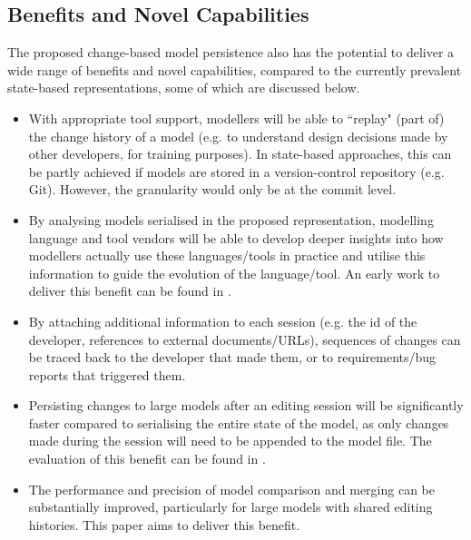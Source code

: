 \subsection{Benefits and Novel Capabilities}
\label{sec:benefits_and_novel_capabilities}
The proposed change-based model persistence also has the potential to deliver a wide range of benefits and novel capabilities, compared to the currently prevalent state-based representations, some of which are discussed below.

\begin{itemize}
  \item With appropriate tool support, modellers will be able to ``replay" (part of) the change history of a model (e.g. to understand design decisions made by other developers, for training purposes). In state-based approaches, this can be partly achieved if models are stored in a version-control repository (e.g. Git). However, the granularity would only be at the commit level.
  \item By analysing models serialised in the proposed representation, modelling language and tool vendors will be able to develop deeper insights into how modellers actually use these languages/tools in practice and utilise this information to guide the evolution of the language/tool. An early work to deliver this benefit can be found in \cite{polack2019towards}.
  \item By attaching additional information to each session (e.g. the id of the developer, references to external documents/URLs), sequences of changes can be traced back to the developer that made them, or to requirements/bug reports that triggered them.
  \item Persisting changes to large models after an editing session will be significantly faster compared to serialising the entire state of the model, as only changes made during the session will need to be appended to the model file. The evaluation of this benefit can be found in \cite{yohannis2018towards,DBLP:conf/models/YohannisRPK18}.
  \item The performance and precision of model comparison and merging can be substantially improved, particularly for large models with shared editing histories. This paper aims to deliver this benefit.
\end{itemize}

